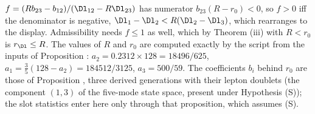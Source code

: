 $f = (Rb_{23} - b_{12})/(\Dl_{12} - R\Dl_{23})$ has numerator $b_{23}(R - r_{0}) < 0$, so $f > 0$ iff the denominator is negative, $\Dl_{1} - \Dl_{2} < R(\Dl_{2} - \Dl_{3})$, which rearranges to the display. Admissibility needs $f \le 1$ as well, which by Theorem (iii) with $R < r_{0}$ is $r_{\Dl} \le R$. The values of $R$ and $r_{0}$ are computed exactly by the script from the inputs of Proposition : $a_{2} = 0.2312 \times 128 = 18496/625$, $a_{1} = \tfrac35(128 - a_{2}) = 184512/3125$, $a_{3} = 500/59$. The coefficients $b_{i}$ behind $r_{0}$ are those of Proposition , three derived generations with their lepton doublets (the component $(1,3)$ of the five-mode state space, present under Hypothesis (S)); the slot statistics enter here only through that proposition, which assumes (S).
